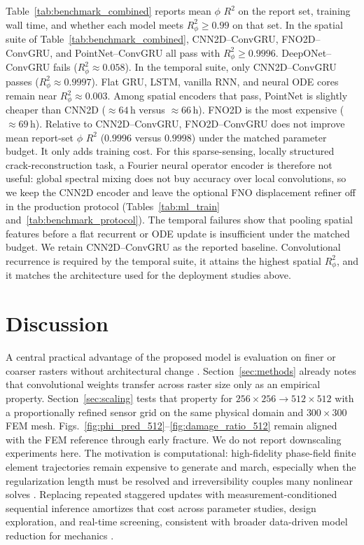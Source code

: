 \documentclass[10pt]{article}
\theoremstyle{definition}
\begin{document}
Table~\ref{tab:benchmark_combined} reports mean $\phi$ $R^2$ on the report set, training wall time, and whether each model meets $R^2_{\phi}\ge0.99$ on that set.
%
In the spatial suite of Table~\ref{tab:benchmark_combined}, CNN2D--ConvGRU, FNO2D--ConvGRU, and PointNet--ConvGRU all pass with $R^2_{\phi}\ge0.9996$.
%
DeepONet--ConvGRU fails ($R^2_{\phi}\approx0.058$).
%
In the temporal suite, only CNN2D--ConvGRU passes ($R^2_{\phi}\approx0.9997$).
%
Flat GRU, LSTM, vanilla RNN, and neural ODE cores remain near $R^2_{\phi}\approx0.003$.
%
Among spatial encoders that pass, PointNet is slightly cheaper than CNN2D ($\approx64\,\mathrm{h}$ versus $\approx66\,\mathrm{h}$).
%
FNO2D is the most expensive ($\approx69\,\mathrm{h}$).
%
Relative to CNN2D--ConvGRU, FNO2D--ConvGRU does not improve mean report-set $\phi$ $R^2$ ($0.9996$ versus $0.9998$) under the matched parameter budget.
%
It only adds training cost.
%
For this sparse-sensing, locally structured crack-reconstruction task, a Fourier neural operator encoder is therefore not useful: global spectral mixing does not buy accuracy over local convolutions, so we keep the CNN2D encoder and leave the optional FNO displacement refiner off in the production protocol (Tables~\ref{tab:ml_train} and~\ref{tab:benchmark_protocol}).
%
The temporal failures show that pooling spatial features before a flat recurrent or ODE update is insufficient under the matched budget.
%
We retain CNN2D--ConvGRU as the reported baseline.
%
Convolutional recurrence is required by the temporal suite, it attains the highest spatial $R^2_{\phi}$, and it matches the architecture used for the deployment studies above.


\section{Discussion}\label{sec:discussions}

A central practical advantage of the proposed model is evaluation on finer or coarser rasters without architectural change \cite{lecun1998,ballas2016,shi2015,geneva2020}.
%
Section~\ref{sec:methods} already notes that convolutional weights transfer across raster size only as an empirical property.
%
Section~\ref{sec:scaling} tests that property for $256\times256\to512\times512$ with a proportionally refined sensor grid on the same physical domain and $300\times300$ FEM mesh.
%
Figs.~\ref{fig:phi_pred_512}--\ref{fig:damage_ratio_512} remain aligned with the FEM reference through early fracture.
%
We do not report downscaling experiments here.
%
The motivation is computational: high-fidelity phase-field finite element trajectories remain expensive to generate and march, especially when the regularization length must be resolved and irreversibility couples many nonlinear solves \cite{bourdin2007,ambati2015,miehe2010a}.
%
Replacing repeated staggered updates with measurement-conditioned sequential inference amortizes that cost across parameter studies, design exploration, and real-time screening, consistent with broader data-driven model reduction for mechanics \cite{lee2020,geneva2020}.
\end{document}
